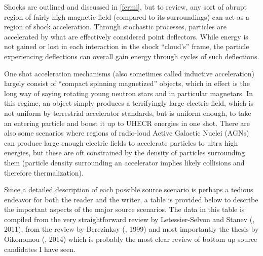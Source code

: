 Shocks are outlined and discussed in \autoref{fermi}, but to review, any sort of abrupt region of fairly high magnetic field (compared to its surroundings) can act as a region of shock acceleration. Through stochastic processes, particles are accelerated by what are effectively considered point deflectors. While energy is not gained or lost in each interaction in the shock ``cloud's'' frame, the particle experiencing deflections can overall gain energy through cycles of such deflections.

One shot acceleration mechanisms (also sometimes called inductive acceleration) largely consist of ``compact spinning magnetized'' objects, which in effect is the long way of saying rotating young neutron stars and in particular magnetars. In this regime, an object simply produces a terrifyingly large electric field, which is not uniform by terrestrial accelerator standards, but is uniform enough, to take an entering particle and boost it up to UHECR energies in one shot. There are also some scenarios where regions of radio-loud Active Galactic Nuclei (AGNs) can produce large enough electric fields to accelerate particles to ultra high energies, but these are oft constrained by the density of particles surrounding them (particle density surrounding an accelerator implies likely collisions and therefore thermalization). 

Since a detailed description of each possible source scenario is perhaps a tedious endeavor for both the reader and the writer, a table is provided below to describe the important aspects of the major source scenarios. The data in this table is compiled from the very straightforward review by Letessier-Selvon and Stanev (\cite{stanev}, 2011), from the review by Berezinksy (\cite{tds}, 1999) and most importantly the thesis by Oikonomou (\cite{foteini}, 2014) which is probably the most clear review of bottom up source candidates I have seen.
\newpage
{}

